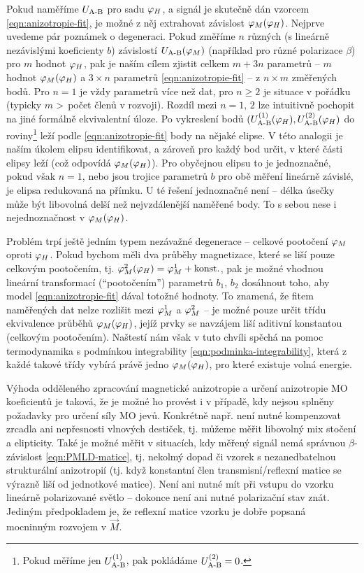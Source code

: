 Pokud naměříme $U_\textrm{A-B}$ pro sadu $\varphi_H$, a signál je skutečně dán vzorcem \eqref{eqn:anizotropie-fit}, je možné z něj extrahovat závislost $\varphi_M(\varphi_H)$.
Nejprve uvedeme pár poznámek o degeneraci.
Pokud změříme $n$ různých (s lineárně nezávislými koeficienty $b$) závislostí $U_\textrm{A-B}(\varphi_M)$ (například pro různé polarizace $\beta$) pro $m$ hodnot $\varphi_H$, pak je naším cílem zjistit celkem $m+3n$ parametrů -- $m$ hodnot $\varphi_M(\varphi_H)$ a $3\times n$ parametrů \eqref{eqn:anizotropie-fit} -- z $n\times m$ změřených bodů.
Pro $n=1$ je vždy parametrů více než dat, pro $n\geq 2$ je situace v pořádku (typicky $m>\,$počet členů v rozvoji).
Rozdíl mezi $n=1,\,2$ lze intuitivně pochopit na jiné formálně ekvivalentní úloze.
Po vykreslení bodů $(U_\textrm{A-B}^{(1)}(\varphi_H), U_\textrm{A-B}^{(2)}(\varphi_H)$ do roviny\footnote{Pokud měříme jen $U_\textrm{A-B}^{(1)}$, pak pokládáme $U_\textrm{A-B}^{(2)}=0$.} leží podle \eqref{eqn:anizotropie-fit} body na nějaké elipse.
V této analogii je naším úkolem elipsu identifikovat, a zároveň pro každý bod určit, v které části elipsy leží (což odpovídá $\varphi_M(\varphi_H)$).
Pro obyčejnou elipsu to je jednoznačné, pokud však $n=1$, nebo jsou trojice parametrů $b$ pro obě měření lineárně závislé, je elipsa redukovaná na přímku.
U té řešení jednoznačné není -- délka úsečky může být libovolná delší než nejvzdálenější naměřené body.
To s sebou nese i nejednoznačnost v $\varphi_M(\varphi_H)$.

Problém trpí ještě jedním typem nezávažné degenerace -- celkové pootočení $\varphi_M$ oproti $\varphi_H$.
Pokud bychom měli dva průběhy magnetizace, které se liší pouze celkovým pootočením, tj. $\varphi_M^2(\varphi_H)=\varphi_M^1 + \textrm{konst.}$,
pak je možné vhodnou lineární transformací (``pootočením'') parametrů $b_1$, $b_2$ dosáhnout toho, aby model \eqref{eqn:anizotropie-fit} dával totožné hodnoty.
To znamená, že fitem naměřených dat nelze rozlišit mezi $\varphi_M^1$ a $\varphi_M^2$ -- je možné pouze určit třídu ekvivalence průběhů $\varphi_M(\varphi_H)$, jejíž prvky se navzájem liší aditivní konstantou (celkovým pootočením).
Naštestí nám však v tuto chvíli spěchá na pomoc termodynamika s podmínkou integrability \eqref{eqn:podminka-integrability}, která z každé takové třídy vybírá právě jedno $\varphi_M(\varphi_H)$, pro které existuje volná energie.

Výhoda odděleného zpracování magnetické anizotropie a určení anizotropie MO koeficientů je taková, že je možné ho provést i v případě, kdy nejsou splněny požadavky pro určení síly MO jevů.
Konkrétně např. není nutné kompenzovat zrcadla ani nepřesnosti vlnových destiček, tj. můžeme měřit libovolný mix stočení a elipticity.
Také je možné měřit v situacích, kdy měřený signál nemá správnou $\beta$-závislost \eqref{eqn:PMLD-matice}, tj. nekolmý dopad či vzorek s nezanedbatelnou strukturální anizotropií (tj. když konstantní člen transmisní/reflexní matice se výrazně liší od jednotkové matice).
Není ani nutné mít při vstupu do vzorku lineárně polarizované světlo -- dokonce není ani nutné polarizační stav znát.
Jediným předpokladem je, že reflexní matice vzorku je dobře popsaná mocninným rozvojem v $\vec{M}$.

